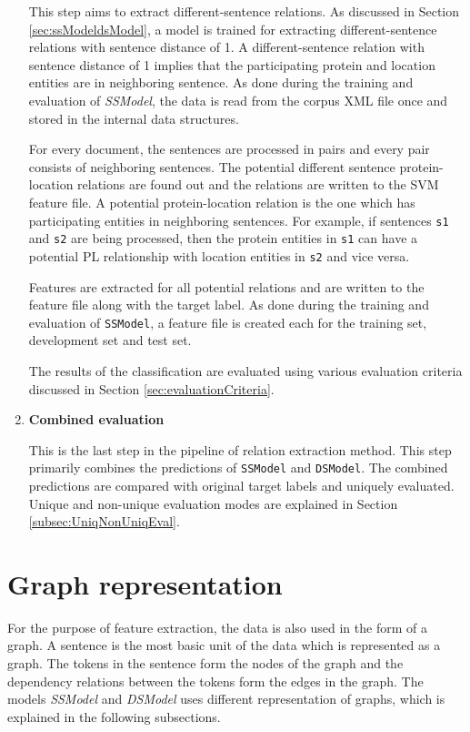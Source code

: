 \begin{enumerate}
This step aims to extract different-sentence relations. As discussed in Section \ref{sec:ssModeldsModel}, a model is trained for extracting different-sentence relations with sentence distance of 1. A different-sentence relation with sentence distance of 1 implies that the participating protein and location entities are in neighboring sentence. As done during the training and evaluation of \textit{SSModel}, the data is read from the corpus XML file once and stored in the internal data structures.

For every document, the sentences are processed in pairs and every pair consists of neighboring sentences. The potential different sentence protein-location relations are found out and the relations are written to the SVM feature file. A potential protein-location relation is the one which has participating entities in  neighboring sentences. For example, if sentences \texttt{s1} and \texttt{s2} are being processed, then the protein entities in \texttt{s1} can have a potential PL relationship with location entities in \texttt{s2} and vice versa.

Features are extracted for all potential relations and are written to the feature file along with the target label. As done during the training and evaluation of \texttt{SSModel}, a feature file is created each for the training set, development set and test set.

The results of the classification are evaluated using various evaluation criteria discussed in Section \ref{sec:evaluationCriteria}.

\item \textbf{Combined evaluation}

This is the last step in the pipeline of relation extraction method. This step primarily combines the predictions of \texttt{SSModel} and \texttt{DSModel}. The  combined predictions are compared with original target labels and uniquely evaluated. Unique and non-unique evaluation modes are explained in Section \ref{subsec:UniqNonUniqEval}.

\end{enumerate}

\section{Graph representation} \label{sec:graphRep}

For the purpose of feature extraction, the data is also used in the form of a graph. A sentence is the most basic unit of the data which is represented as a graph. The tokens in the sentence form the nodes of the graph and the dependency relations between the tokens form the edges in the graph. The models \textit{SSModel} and \textit{DSModel} uses different representation of graphs,  which is explained in the following subsections.

